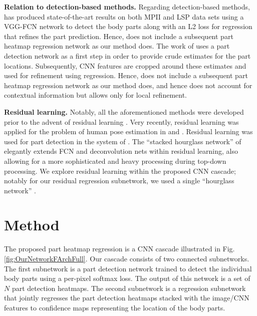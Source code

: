 \documentclass[runningheads]{llncs}
\begin{document}
\textbf{Relation to detection-based methods.} Regarding detection-based methods, \cite{pishchulin2015deepcut} has produced state-of-the-art results on both MPII and LSP data sets using a VGG-FCN network \cite{simonyan2014very, long2015fully} to detect the body parts along with an L2 loss for regression that refines the part prediction. Hence, \cite{pishchulin2015deepcut} does not include a subsequent part heatmap regression network as our method does. The work of \cite{tompson2015efficient} uses a part detection network as a first step in order to provide crude estimates for the part locations. Subsequently, CNN features are cropped around these estimates and used for refinement using regression. Hence, \cite{tompson2015efficient} does not include a subsequent part heatmap regression network as our method does, and hence does not account for contextual information but allows only for local refinement. 

\textbf{Residual learning.} Notably, all the aforementioned methods were developed prior to the advent of residual learning \cite{he2016deep}. Very recently, residual learning was applied for the problem of human pose estimation in \cite{insafutdinov2016deepercut} and \cite{newell2016stacked}. Residual learning was used for part detection in the system of \cite{insafutdinov2016deepercut}. The ``stacked hourglass network'' of \cite{newell2016stacked} elegantly extends FCN \cite{long2015fully} and deconvolution nets \cite{zeiler2011adaptive} within residual learning, also allowing for a more sophisticated and heavy processing during top-down processing. We explore residual learning within the proposed CNN cascade; notably for our residual regression subnetwork, we used a single ``hourglass network'' \cite{newell2016stacked}.

\section{Method}

The proposed part heatmap regression is a CNN cascade illustrated in Fig. \ref{fig:OurNetworkFArchFull}. Our cascade consists of two connected subnetworks. The first subnetwork is a part detection network trained to detect the individual body parts using a per-pixel softmax loss. The output of this network is a set of $N$ part detection heatmaps. The second subnetwork is a regression subnetwork that jointly regresses the part detection heatmaps stacked with the image/CNN features to confidence maps representing the location of the body parts. 
\end{document}
